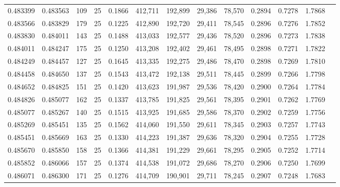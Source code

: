 \begin{tabular}{rrrrrrrrrrrrr}
0.483399 & 0.483563 &   109 &  25 &                                     0.1866 & 412,711 & 192,899 &  29,386 &  78,570 & 0.2894 & 0.7278 & 1.7868 \\
0.483566 & 0.483829 &   179 &  25 &                                     0.1225 & 412,890 & 192,720 &  29,411 &  78,545 & 0.2896 & 0.7276 & 1.7852 \\
0.483830 & 0.484011 &   143 &  25 &                                     0.1488 & 413,033 & 192,577 &  29,436 &  78,520 & 0.2896 & 0.7273 & 1.7838 \\
0.484011 & 0.484247 &   175 &  25 &                                     0.1250 & 413,208 & 192,402 &  29,461 &  78,495 & 0.2898 & 0.7271 & 1.7822 \\
0.484249 & 0.484457 &   127 &  25 &                                     0.1645 & 413,335 & 192,275 &  29,486 &  78,470 & 0.2898 & 0.7269 & 1.7810 \\
0.484458 & 0.484650 &   137 &  25 &                                     0.1543 & 413,472 & 192,138 &  29,511 &  78,445 & 0.2899 & 0.7266 & 1.7798 \\
0.484652 & 0.484825 &   151 &  25 &                                     0.1420 & 413,623 & 191,987 &  29,536 &  78,420 & 0.2900 & 0.7264 & 1.7784 \\
0.484826 & 0.485077 &   162 &  25 &                                     0.1337 & 413,785 & 191,825 &  29,561 &  78,395 & 0.2901 & 0.7262 & 1.7769 \\
0.485077 & 0.485267 &   140 &  25 &                                     0.1515 & 413,925 & 191,685 &  29,586 &  78,370 & 0.2902 & 0.7259 & 1.7756 \\
0.485269 & 0.485451 &   135 &  25 &                                     0.1562 & 414,060 & 191,550 &  29,611 &  78,345 & 0.2903 & 0.7257 & 1.7743 \\
0.485451 & 0.485669 &   163 &  25 &                                     0.1330 & 414,223 & 191,387 &  29,636 &  78,320 & 0.2904 & 0.7255 & 1.7728 \\
0.485670 & 0.485850 &   158 &  25 &                                     0.1366 & 414,381 & 191,229 &  29,661 &  78,295 & 0.2905 & 0.7252 & 1.7714 \\
0.485852 & 0.486066 &   157 &  25 &                                     0.1374 & 414,538 & 191,072 &  29,686 &  78,270 & 0.2906 & 0.7250 & 1.7699 \\
0.486071 & 0.486300 &   171 &  25 &                                     0.1276 & 414,709 & 190,901 &  29,711 &  78,245 & 0.2907 & 0.7248 & 1.7683 \\

\end{tabular}
